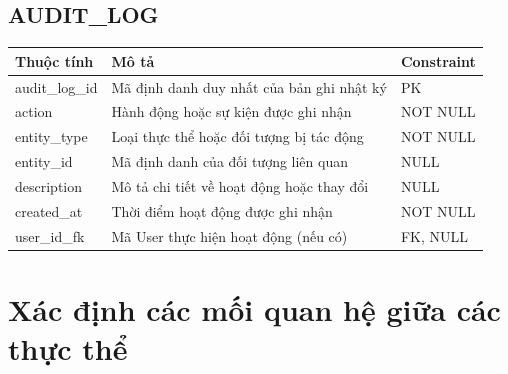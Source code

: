 \subsection{AUDIT\_LOG}
\begin{center}
\begin{longtable}{|>{\raggedright\arraybackslash}p{3.5cm}|>{\raggedright\arraybackslash}p{6.5cm}|>{\raggedright\arraybackslash}p{4.5cm}|}
\hline
\textbf{Thuộc tính} & \textbf{Mô tả} & \textbf{Constraint} \\ \hline
\endhead
audit\_log\_id & Mã định danh duy nhất của bản ghi nhật ký & PK \\ \hline
action & Hành động hoặc sự kiện được ghi nhận & NOT NULL \\ \hline
entity\_type & Loại thực thể hoặc đối tượng bị tác động & NOT NULL \\ \hline
entity\_id & Mã định danh của đối tượng liên quan & NULL \\ \hline
description & Mô tả chi tiết về hoạt động hoặc thay đổi & NULL \\ \hline
created\_at & Thời điểm hoạt động được ghi nhận & NOT NULL \\ \hline
user\_id\_fk & Mã User thực hiện hoạt động (nếu có) & FK, NULL \\ \hline
\end{longtable}
\end{center}

\section{Xác định các mối quan hệ giữa các thực thể}

